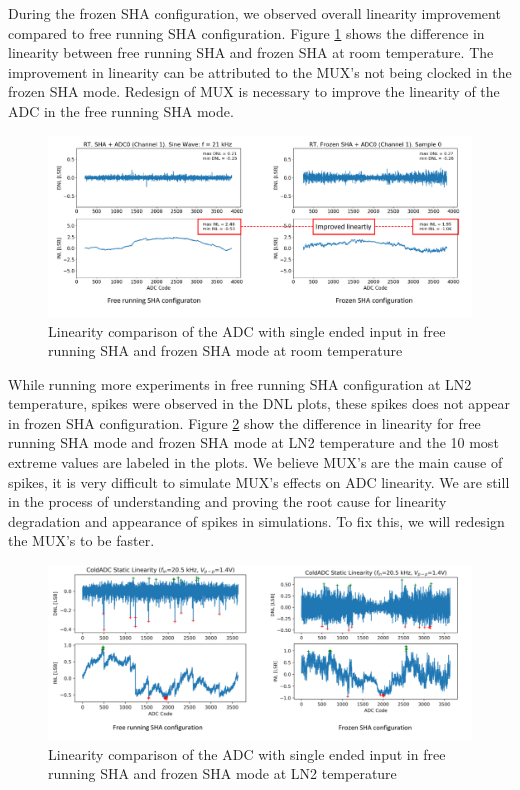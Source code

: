During the frozen SHA configuration, we observed overall linearity improvement compared to free running SHA configuration. Figure \ref{fig:linearity_rt_free_frozen} shows the difference in linearity between free running SHA and frozen SHA at room temperature. The improvement in linearity can be attributed to the MUX's not being clocked in the frozen SHA mode. Redesign of MUX is necessary to improve the linearity of the ADC in the free running SHA mode. 
\begin{figure}[h!]
\centering
  \includegraphics[width=1\linewidth]{figures/prakash_fig/linearity_rt_free_frozen.png}
  \caption{Linearity comparison of the ADC with single ended input in free running SHA and frozen SHA mode at room temperature}
  \label{fig:linearity_rt_free_frozen}
\end{figure}

While running more experiments in free running SHA configuration at LN2 temperature, spikes were observed in the DNL plots, these spikes does not appear in frozen SHA configuration. Figure \ref{fig:linearity_free_frozen} show the difference in linearity for free running SHA mode and frozen SHA mode at LN2 temperature and the 10 most extreme values are labeled in the plots. We believe MUX's are the main cause of spikes, it is very difficult to simulate MUX's effects on ADC linearity. We are still in the process of understanding and proving the root cause for linearity degradation and appearance of spikes in simulations. To fix this, we will redesign the MUX's to be faster. 
\begin{figure}[h!]
\centering
  \includegraphics[width=1\linewidth]{figures/prakash_fig/linearity_free_frozen.png}
  \caption{Linearity comparison of the ADC with single ended input in free running SHA and frozen SHA mode at LN2 temperature}
  \label{fig:linearity_free_frozen}
\end{figure}